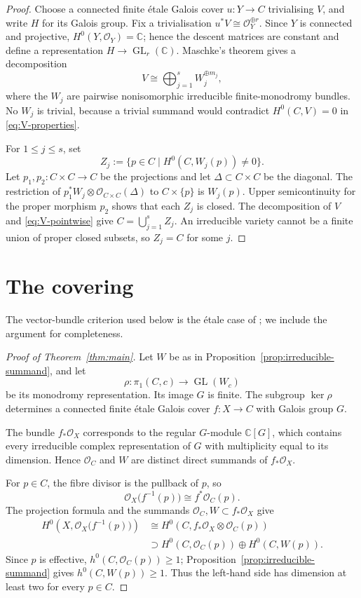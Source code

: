 \documentclass[10pt,a4paper,reqno]{amsart}
\theoremstyle{remark}
\newcommand{\CC}{\mathbb{C}}
\newcommand{\OO}{\mathcal{O}}
\newcommand{\tens}{\otimes}
\begin{document}
\begin{proof}
Choose a connected finite \'{e}tale Galois cover $u\colon Y\to C$ trivialising
$V$, and write $H$ for its Galois group.  Fix a trivialisation
$u^*V\cong\OO_Y^{\oplus r}$.  Since $Y$ is connected and projective,
$H^0(Y,\OO_Y)=\CC$; hence the descent matrices are constant and define a
representation $H\to\operatorname{GL}_r(\CC)$.  Maschke's theorem gives a
decomposition
\[
  V\cong\bigoplus_{j=1}^{s}W_j^{\oplus m_j},
\]
where the $W_j$ are pairwise nonisomorphic irreducible finite-monodromy
bundles.  No $W_j$ is trivial, because a trivial summand would contradict
$H^0(C,V)=0$ in \eqref{eq:V-properties}.

For $1\leq j\leq s$, set
\[
  Z_j:=\{p\in C\mid H^0(C,W_j(p))\neq 0\}.
\]
Let $p_1,p_2\colon C\times C\to C$ be the projections and let
$\Delta\subset C\times C$ be the diagonal.  The restriction of
$p_1^*W_j\tens\OO_{C\times C}(\Delta)$ to $C\times\{p\}$ is $W_j(p)$.
Upper semicontinuity for the proper morphism $p_2$ shows that each $Z_j$ is
closed.  The decomposition of $V$ and \eqref{eq:V-pointwise} give
$C=\bigcup_{j=1}^{s}Z_j$.  An irreducible variety cannot be a finite union of
proper closed subsets, so $Z_j=C$ for some $j$.
\end{proof}

\section{The covering}

The vector-bundle criterion used below is the \'{e}tale case of
\cite[Lemma~5.4]{LandesmanLittPW}; we include the argument for completeness.

\begin{proof}[Proof of Theorem~\ref{thm:main}]
Let $W$ be as in Proposition~\ref{prop:irreducible-summand}, and let
\[
  \rho\colon\pi_1(C,c)\longrightarrow\operatorname{GL}(W_c)
\]
be its monodromy representation.  Its image $G$ is finite.  The subgroup
$\ker\rho$ determines a connected finite \'{e}tale Galois cover
$f\colon X\to C$ with Galois group $G$.

The bundle $f_*\OO_X$ corresponds to the regular $G$-module $\CC[G]$, which
contains every irreducible complex representation of $G$ with multiplicity
equal to its dimension.  Hence $\OO_C$ and $W$ are distinct direct summands
of $f_*\OO_X$.

For $p\in C$, the fibre divisor is the pullback of $p$, so
\[
  \OO_X\bigl(f^{-1}(p)\bigr)\cong f^*\OO_C(p).
\]
The projection formula and the summands $\OO_C,W\subset f_*\OO_X$ give
\begin{align*}
  H^0\!\left(X,\OO_X\bigl(f^{-1}(p)\bigr)\right)
  &\cong H^0\!\left(C,f_*\OO_X\tens\OO_C(p)\right)\\
  &\supset H^0(C,\OO_C(p))\oplus H^0(C,W(p)).
\end{align*}
Since $p$ is effective, $h^0(C,\OO_C(p))\geq1$; Proposition~\ref{prop:irreducible-summand}
gives $h^0(C,W(p))\geq1$.  Thus the left-hand side has dimension at least two
for every $p\in C$.
\end{proof}
\end{document}

